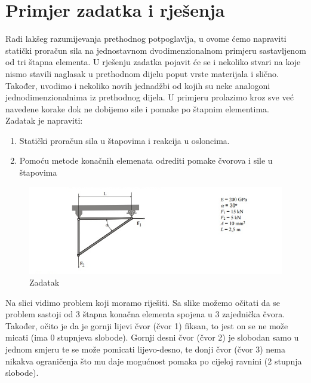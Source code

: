 \documentclass[a4paper,twoside,12pt]{memoir} %
\begin{document}
\newpage
\section{Primjer zadatka i rješenja}
\label{primjer_zadatka_i_rjesenja}
Radi lakšeg razumijevanja prethodnog potpoglavlja, u ovome ćemo napraviti statički proračun sila na jednostavnom dvodimenzionalnom primjeru sastavljenom od tri štapna elementa. U rješenju zadatka pojavit će se i nekoliko stvari na koje nismo stavili naglasak u prethodnom dijelu poput vrste materijala i slično. Također, uvodimo i nekoliko novih jednadžbi od kojih su neke analogoni jednodimenzionalnima iz prethodnog dijela. U primjeru prolazimo kroz sve već navedene korake dok ne dobijemo sile i pomake po štapnim elementima. \\
Zadatak je napraviti: 
\begin{enumerate}
    \item Statički proračun sila u štapovima i reakcija u osloncima.
    \item Pomoću metode konačnih elemenata odrediti pomake čvorova i sile u štapovima
\end{enumerate}

\begin{figure}[h!t]
\begin{center}
\includegraphics[scale=0.6]{pictures/chapter_fem/problem_glavas.png}
\caption{Zadatak}
\label{fig:problem__not_noted}
\end{center}
\end{figure}

Na slici vidimo problem koji moramo riješiti. Sa slike možemo očitati da se problem sastoji od 3 štapna konačna elementa spojena u 3 zajednička čvora. Također, očito je da je gornji lijevi čvor (čvor 1) fiksan, to jest on se ne može micati (ima 0 stupnjeva slobode). Gornji desni čvor (čvor 2) je slobodan samo u jednom smjeru te se može pomicati lijevo-desno, te donji čvor (čvor 3) nema nikakva ograničenja što mu daje mogućnost pomaka po cijeloj ravnini (2 stupnja slobode). \\
\end{document}
